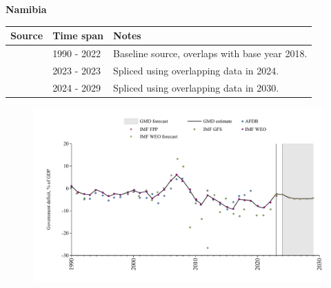 \documentclass[12pt,a4paper,landscape]{article}
\begin{document}
\begin{adjustbox}{max totalsize={\paperwidth}{\paperheight},center}
\begin{minipage}[t][\textheight][t]{\textwidth}
\vspace*{0.5cm}
{}
\begin{center}
{\Large\bfseries Namibia}
\end{center}
\vspace{0.5cm}
\begin{table}[H]
\centering
\small
\begin{tabular}{|l|l|l|}
\hline
\textbf{Source} & \textbf{Time span} & \textbf{Notes} \\
\hline
\rowcolor{white}\cite{IMF_WEO}& 1990 - 2022 &Baseline source, overlaps with base year 2018.\\
\rowcolor{lightgray}\cite{IMF_GFS}& 2023 - 2023 &Spliced using overlapping data in 2024.\\
\rowcolor{white}\cite{IMF_WEO_forecast}& 2024 - 2029 &Spliced using overlapping data in 2030.\\
\hline
\end{tabular}
\end{table}
\begin{figure}[H]
\centering
\includegraphics[width=\textwidth,height=0.6\textheight,keepaspectratio]{graphs/NAM_govdef_GDP.pdf}
\end{figure}
\end{minipage}
\end{adjustbox}
\end{document}
